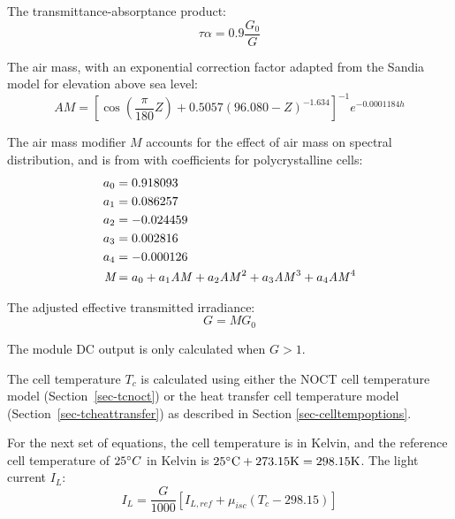 \documentclass[12pt,letterpaper]{article}
\begin{document}
The transmittance-absorptance product:
\begin{equation}
\tau\alpha = 0.9 \frac{G_0}{G}
\end{equation}

The air mass, with an exponential correction factor adapted from the Sandia model for elevation above sea level:
\begin{equation}\label{eqn-cecam}
\textit{AM} = \left[\cos\left( \frac{\pi}{180}Z \right)+0.5057(96.080-Z)^{-1.634} \right]^{-1} e^{-0.0001184\mathit{h}}
\end{equation}

The air mass modifier $M$ accounts for the effect of air mass on spectral distribution, and is from \citet{king2004} with coefficients for polycrystalline cells:
\begin{align}
a_0 &= 0.918093 \notag\\
a_1 &= 0.086257 \notag\\
a_2 &= -0.024459 \notag\\
a_3 &= 0.002816 \notag\\
a_4 &= -0.000126 \notag\\
\textit{M} &= a_0 + a_1 \mathit{AM} + a_2 \mathit{AM}^2 + a_3\mathit{AM}^3+ a_4\mathit{AM}^4
\end{align}

The adjusted effective transmitted irradiance:
\begin{equation}\label{eqn-effectivetransmittedirradiance}
G =  MG_0
\end{equation}

The module DC output is only calculated when $G>1$.

The cell temperature $T_c$ is calculated using either the NOCT cell temperature model (Section~\ref{sec-tcnoct}) or the heat transfer cell temperature model (Section~\ref{sec-tcheattransfer}) as described in Section \ref{sec-celltempoptions}.

For the next set of equations, the cell temperature is in Kelvin, and the reference cell temperature of $25\degree C$ in Kelvin is $25\degree \text{C} + 273.15 \text{K} = 298.15 \text{K}$.
The light current $I_L$:
\begin{equation}\label{eqn-lightcurrent}
I_L = \frac{G}{1000}\left[I_{L,ref} + \mu_{isc} (T_c - 298.15 )\right]
\end{equation}
\end{document}
